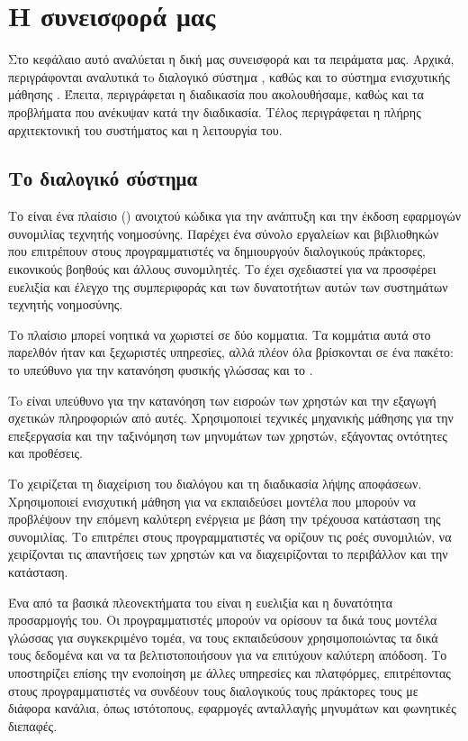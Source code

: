\chapter{Η συνεισφορά μας}

Στο κεφάλαιο αυτό αναλύεται η δική μας συνεισφορά και τα πειράματα μας. Αρχικά, περιγράφονται αναλυτικά τo διαλογικό σύστημα , καθώς και το σύστημα ενισχυτικής μάθησης . Έπειτα, περιγράφεται η διαδικασία που ακολουθήσαμε, καθώς και τα προβλήματα που ανέκυψαν κατά την διαδικασία. Τέλος περιγράφεται η πλήρης αρχιτεκτονική του συστήματος και η λειτουργία του.

\section{Το διαλογικό σύστημα }

Το  είναι ένα πλαίσιο () ανοιχτού κώδικα για την ανάπτυξη και την έκδοση εφαρμογών συνομιλίας τεχνητής νοημοσύνης. Παρέχει ένα σύνολο εργαλείων και βιβλιοθηκών που επιτρέπουν στους προγραμματιστές να δημιουργούν διαλογικούς πράκτορες, εικονικούς βοηθούς και άλλους συνομιλητές. Το  έχει σχεδιαστεί για να προσφέρει ευελιξία και έλεγχο της συμπεριφοράς και των δυνατοτήτων αυτών των συστημάτων τεχνητής νοημοσύνης.

Το πλαίσιο  μπορεί νοητικά να χωριστεί σε δύο κομματια. Τα κομμάτια αυτά στο παρελθόν ήταν και ξεχωριστές υπηρεσίες, αλλά πλέον όλα βρίσκονται σε ένα πακέτο: το  υπεύθυνο για την κατανόηση φυσικής γλώσσας και το .

To  είναι υπεύθυνο για την κατανόηση των εισροών των χρηστών και την εξαγωγή σχετικών πληροφοριών από αυτές. Χρησιμοποιεί τεχνικές μηχανικής μάθησης για την επεξεργασία και την ταξινόμηση των μηνυμάτων των χρηστών, εξάγοντας οντότητες και προθέσεις.

Το  χειρίζεται τη διαχείριση του διαλόγου και τη διαδικασία λήψης αποφάσεων. Χρησιμοποιεί ενισχυτική μάθηση για να εκπαιδεύσει μοντέλα που μπορούν να προβλέψουν την επόμενη καλύτερη ενέργεια με βάση την τρέχουσα κατάσταση της συνομιλίας. Το  επιτρέπει στους προγραμματιστές να ορίζουν τις ροές συνομιλιών, να χειρίζονται τις απαντήσεις των χρηστών και να διαχειρίζονται το περιβάλλον και την κατάσταση.

Ένα από τα βασικά πλεονεκτήματα του  είναι η ευελιξία και η δυνατότητα προσαρμογής του. Οι προγραμματιστές μπορούν να ορίσουν τα δικά τους μοντέλα γλώσσας για συγκεκριμένο τομέα, να τους εκπαιδεύσουν χρησιμοποιώντας τα δικά τους δεδομένα και να τα βελτιστοποιήσουν για να επιτύχουν καλύτερη απόδοση. Το  υποστηρίζει επίσης την ενοποίηση με άλλες υπηρεσίες και πλατφόρμες, επιτρέποντας στους προγραμματιστές να συνδέουν τους διαλογικούς τους πράκτορες τους με διάφορα κανάλια, όπως ιστότοπους, εφαρμογές ανταλλαγής μηνυμάτων και φωνητικές διεπαφές.

